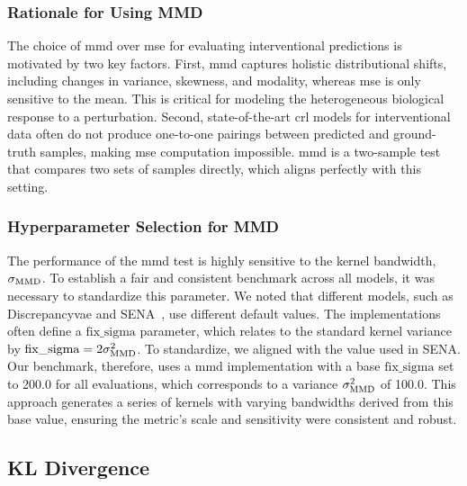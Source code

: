 \subsubsection{Rationale for Using MMD}
\label{app:metrics:mmd:rationale}

The choice of \gls{mmd} over \gls{mse} for evaluating interventional predictions is motivated by two key factors.
First, \gls{mmd} captures holistic distributional shifts, including changes in variance, skewness, and modality, whereas \gls{mse} is only sensitive to the mean.
This is critical for modeling the heterogeneous biological response to a perturbation.
Second, state-of-the-art \gls{crl} models for interventional data often do not produce one-to-one pairings between predicted and ground-truth samples, making \gls{mse} computation impossible.
\gls{mmd} is a two-sample test that compares two sets of samples directly, which aligns perfectly with this setting.

\subsubsection{Hyperparameter Selection for MMD}
\label{app:metrics:mmd:hyperparameters}

The performance of the \gls{mmd} test is highly sensitive to the kernel bandwidth, $\sigma_{\text{MMD}}$.
To establish a fair and consistent benchmark across all models, it was necessary to standardize this parameter.
We noted that different models, such as Discrepancy\gls{vae} and SENA~\citep{de2025interpretable}, use different default values.
The implementations often define a $\text{fix\_sigma}$ parameter, which relates to the standard kernel variance by $\text{fix\_sigma} = 2\sigma_{\text{MMD}}^2$.
To standardize, we aligned with the value used in SENA.
Our benchmark, therefore, uses a \gls{mmd} implementation with a base $\text{fix\_sigma}$ set to 200.0 for all evaluations, which corresponds to a variance $\sigma_{\text{MMD}}^2$ of 100.0.
This approach generates a series of kernels with varying bandwidths derived from this base value, ensuring the metric's scale and sensitivity were consistent and robust.

\subsection{KL Divergence}
\label{app:metrics:kld}

